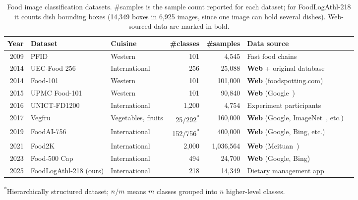 \begin{table}[thb]
\centering
\caption{Food image classification datasets. \#samples is the sample count reported for each dataset; for FoodLogAthl-218 it counts dish bounding boxes (14,349 boxes in 6,925 images, since one image can hold several dishes). Web-sourced data are marked in bold.}
\begin{tabular}{@{}rllrrll@{}}
\toprule
Year & Dataset & Cuisine & \#classes & \#samples & Data source \\
\midrule
2009 & PFID~\cite{chen2009pfid} & Western & 101 & 4,545 & Fast food chains \\
2014 & UEC-Food 256~\cite{kawano2015automatic} & International & 256 & 25,088 & \textbf{Web} + original database \\
2014 & Food-101~\cite{bossard2014food} & Western & 101 & 101,000 & \textbf{Web} (foodspotting.com) \\
2015 & UPMC Food-101~\cite{wang2015recipe} & Western & 101 & 90,840 & \textbf{Web} (Google~\cite{google}) \\
2016 & UNICT-FD1200~\cite{farinella2016retrieval} & International & 1,200 & 4,754 & Experiment participants \\
2017 & Vegfru~\cite{hou2017vegfru} & Vegetables, fruits & 25/292\textsuperscript{*} & 160,000 & \textbf{Web} (Google, ImageNet~\cite{imagenet}, etc.) \\
2019 & FoodAI-756~\cite{sahoo2019foodai} & International & 152/756\textsuperscript{*} & 400,000 & \textbf{Web} (Google, Bing, etc.) \\
2021 & Food2K~\cite{min2023large} & International & 2,000 & 1,036,564 & \textbf{Web} (Meituan~\cite{meituan}) \\
2023 & Food-500 Cap~\cite{ma2023food} & International & 494 & 24,700 & \textbf{Web} (Google, Bing) \\
\midrule
2025 & FoodLogAthl-218 (ours) & International & 218 & 14,349 & Dietary management app \\
\bottomrule
\end{tabular}

\smallskip
\raggedright\footnotesize\textsuperscript{*}Hierarchically structured dataset; $n$/$m$ means $m$ classes grouped into $n$ higher-level classes.
\label{Food image dataset table}
\end{table}
